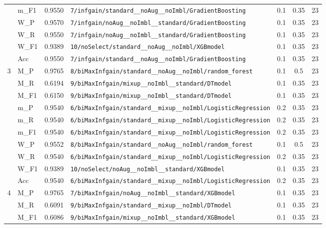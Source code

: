 \begin{table}[htbp]
\begin{tabular}{|c|l|c|>{\ttfamily\footnotesize}p{7.2cm}|c|c|c|}
 & m\_F1 & 0.9550 & \texttt{7/infgain/standard\_\_noAug\_\_noImbl/GradientBoosting} & 0.1 & 0.35  & 23 \\ 
 & W\_P & 0.9570 & \texttt{7/infgain/noAug\_\_noImbl\_\_standard/GradientBoosting} & 0.1 & 0.35  & 23 \\ 
 & W\_R & 0.9550 & \texttt{7/infgain/noAug\_\_noImbl\_\_standard/GradientBoosting} & 0.1 & 0.35  & 23 \\ 
 & W\_F1 & 0.9389 & \texttt{10/noSelect/standard\_\_noAug\_\_noImbl/XGBmodel} & 0.1 & 0.35  & 23 \\ 
 & Acc & 0.9550 & \texttt{7/infgain/standard\_\_noAug\_\_noImbl/GradientBoosting} & 0.1 & 0.35  & 23 \\ 
\hline
\multirow{10}{*}{3} & M\_P & 0.9765 & \texttt{8/biMaxInfgain/standard\_\_noAug\_\_noImbl/random\_forest} & 0.1 & 0.5  & 23 \\ 
 & M\_R & 0.6194 & \texttt{9/biMaxInfgain/mixup\_\_noImbl\_\_standard/DTmodel} & 0.1 & 0.35  & 23 \\ 
 & M\_F1 & 0.6150 & \texttt{9/biMaxInfgain/mixup\_\_noImbl\_\_standard/DTmodel} & 0.1 & 0.35  & 23 \\ 
 & m\_P & 0.9540 & \texttt{6/biMaxInfgain/standard\_\_mixup\_\_noImbl/LogisticRegression} & 0.2 & 0.35  & 23 \\ 
 & m\_R & 0.9540 & \texttt{6/biMaxInfgain/standard\_\_mixup\_\_noImbl/LogisticRegression} & 0.2 & 0.35  & 23 \\ 
 & m\_F1 & 0.9540 & \texttt{6/biMaxInfgain/standard\_\_mixup\_\_noImbl/LogisticRegression} & 0.2 & 0.35  & 23 \\ 
 & W\_P & 0.9552 & \texttt{8/biMaxInfgain/standard\_\_noAug\_\_noImbl/random\_forest} & 0.1 & 0.5  & 23 \\ 
 & W\_R & 0.9540 & \texttt{6/biMaxInfgain/standard\_\_mixup\_\_noImbl/LogisticRegression} & 0.2 & 0.35  & 23 \\ 
 & W\_F1 & 0.9389 & \texttt{10/noSelect/noAug\_\_noImbl\_\_standard/XGBmodel} & 0.1 & 0.35  & 23 \\ 
 & Acc & 0.9540 & \texttt{6/biMaxInfgain/standard\_\_mixup\_\_noImbl/LogisticRegression} & 0.2 & 0.35  & 23 \\ 
\hline
\multirow{10}{*}{4} & M\_P & 0.9765 & \texttt{7/biMaxInfgain/noAug\_\_noImbl\_\_standard/XGBmodel} & 0.1 & 0.35  & 23 \\ 
 & M\_R & 0.6091 & \texttt{9/biMaxInfgain/standard\_\_mixup\_\_noImbl/DTmodel} & 0.1 & 0.35  & 23 \\ 
 & M\_F1 & 0.6086 & \texttt{9/biMaxInfgain/mixup\_\_noImbl\_\_standard/XGBmodel} & 0.1 & 0.35  & 23 \\ 

\end{tabular}
\end{table}
